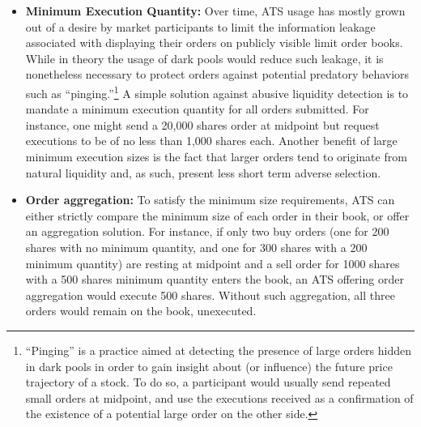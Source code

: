 \begin{itemize}
\item{\textbf{Minimum Execution Quantity:}} Over time, ATS usage has mostly grown out of a desire by market participants to limit the information leakage associated with displaying their orders on publicly visible limit order books. While in theory the usage of dark pools would reduce such leakage, it is nonetheless necessary to protect orders against potential predatory behaviors such as ``pinging.''\footnote{``Pinging'' is a practice aimed at detecting the presence of large orders hidden in dark pools in order to gain insight about (or influence) the future price trajectory of a stock. To do so, a participant would usually send repeated small orders at midpoint, and use the executions received as a confirmation of the existence of a potential large order on the other side.} A simple solution against abusive liquidity detection is to mandate a minimum execution quantity for all orders submitted. For instance, one might send a 20,000 shares order at midpoint but request executions to be of no less than 1,000 shares each. Another benefit of large minimum execution sizes is the fact that larger orders tend to originate from natural liquidity and, as such, present less short term adverse selection.  

\item{\textbf{Order aggregation:}} To satisfy the minimum size requirements, ATS can either strictly compare the minimum size of each order in their book, or offer an aggregation solution. For instance, if only two buy orders (one for 200 shares with no minimum quantity, and one for 300 shares with a 200 minimum quantity) are resting at midpoint and a sell order for 1000 shares with a 500 shares minimum quantity enters the book, an ATS offering order aggregation would execute 500 shares. Without such aggregation, all three orders would remain on the book, unexecuted.


\end{itemize}
